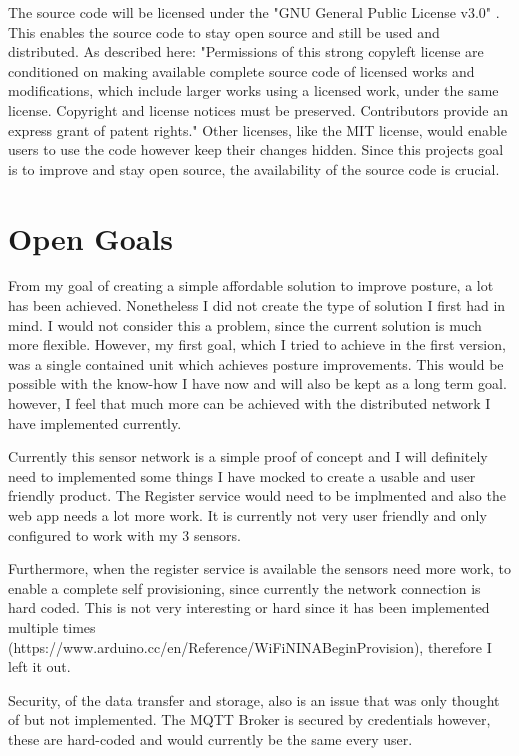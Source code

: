The source code will be licensed under the "GNU General Public License v3.0" \cite{TheGNUGe7:online} \cite{GNUGener3:online}. This enables the source code to stay open source and still be used and distributed. As described here: "Permissions of this strong copyleft license are conditioned on making available complete source code of licensed works and modifications, which include larger works using a licensed work, under the same license. Copyright and license notices must be preserved. Contributors provide an express grant of patent rights." \cite{GNUGener97:online}
Other licenses, like the MIT license, would enable users to use the code however keep their changes hidden. Since this projects goal is to improve and stay open source, the availability of the source code is crucial. \cite{TheMITLi73:online}

\section{Open Goals}

From my goal of creating a simple affordable solution to improve posture, a lot has been achieved. Nonetheless I did not create the type of solution I first had in mind. I would not consider this a problem, since the current solution is much more flexible. However, my first goal, which I tried to achieve in the first version, was a single contained unit which achieves posture improvements. This would be possible with the know-how I have now and will also be kept as a long term goal. however, I feel that much more can be achieved with the distributed network I have implemented currently. 

Currently this sensor network is a simple proof of concept and I will definitely need to implemented some things I have mocked to create a usable and user friendly product.  The Register service would need to be implmented and also the web app needs a lot more work. It is currently not very user friendly and only configured to work with my 3 sensors. 

Furthermore, when the register service is available the sensors need more work, to enable a complete self provisioning, since currently the network connection is hard coded. This is not very interesting or hard since it has been implemented multiple times (https://www.arduino.cc/en/Reference/WiFiNINABeginProvision), therefore I left it out. 

Security, of the data transfer and storage, also is an issue that was only thought of but not implemented. The MQTT Broker is secured by credentials however, these are hard-coded and would currently be the same every user.

